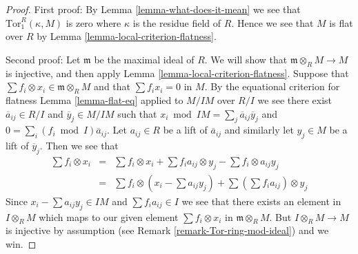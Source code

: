 \documentclass[10pt,a4paper]{amsart}
\theoremstyle{plain}
\theoremstyle{definition}
\theoremstyle{remark}
\numberwithin{equation}{subsection}
\begin{document}
\begin{proof}
First proof: By
Lemma \ref{lemma-what-does-it-mean}
we see that $\text{Tor}_1^R(\kappa, M)$ is zero where $\kappa$
is the residue field of $R$. Hence we see that $M$
is flat over $R$ by
Lemma \ref{lemma-local-criterion-flatness}.

\medskip\noindent
Second proof: Let $\mathfrak m$ be the maximal ideal of $R$.
We will show that $\mathfrak m \otimes_R M \to M$ is injective,
and then apply
Lemma \ref{lemma-local-criterion-flatness}.
Suppose that $\sum f_i \otimes x_i \in \mathfrak m \otimes_R M$
and that $\sum f_i x_i = 0$ in $M$. By the equational criterion
for flatness Lemma \ref{lemma-flat-eq} applied to $M/IM$
over $R/I$ we see there exist $\overline{a}_{ij} \in R/I$
and $\overline{y}_j \in M/IM$ such that
$x_i \bmod IM = \sum_j \overline{a}_{ij} \overline{y}_j $
and $0 = \sum_i (f_i \bmod I) \overline{a}_{ij}$.
Let $a_{ij} \in R$ be a lift of $\overline{a}_{ij}$ and
similarly let $y_j \in M$ be a lift of $\overline{y}_j$.
Then we see that
\begin{eqnarray*}
\sum f_i \otimes x_i
& = &
\sum f_i \otimes x_i +
\sum f_ia_{ij} \otimes y_j -
\sum f_i \otimes a_{ij} y_j
\\
& = &
\sum f_i \otimes (x_i - \sum a_{ij} y_j) +
\sum (\sum f_i a_{ij}) \otimes y_j
\end{eqnarray*}
Since $x_i - \sum a_{ij} y_j \in IM$ and
$\sum f_i a_{ij} \in I$ we see that there exists
an element in $I \otimes_R M$ which maps to our given
element $\sum f_i \otimes x_i$ in $\mathfrak m \otimes_R M$.
But $I \otimes_R M \to M$ is injective by assumption (see
Remark \ref{remark-Tor-ring-mod-ideal}) and we win.
\end{proof}
\end{document}
